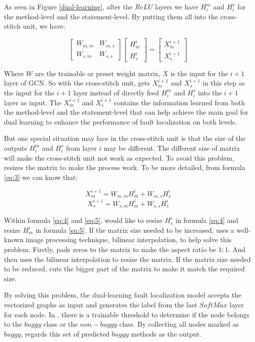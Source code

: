 As seen in Figure \ref{dual-learning}, after the $ReLU$ layers we have $H_i^m$ and $H_i^s$ for the method-level and the statement-level. By putting them all into the cross-stitch unit, we have:

\begin{equation}\label{eq:3}
	\begin{bmatrix}
		W_{m,m} &  W_{m,s} \\
		W_{s,m} &  W_{s,s}
	\end{bmatrix}
	\begin{bmatrix}
		H_m^{i}\\
		H_s^{i}
	\end{bmatrix}=
	\begin{bmatrix}
		X_m^{i+1}\\
		X_s^{i+1}
	\end{bmatrix}
\end{equation}

Where $W$ are the trainable or preset weight matrix, $X$ is the input for the $i+1$ layer of GCN. So with the cross-stitch unit, \tool gets $X_m^{i+1}$ and $X_s^{i+1}$ in this step as the input for the $i+1$ layer instead of directly feed $H_i^m$ and $H_i^s$ into the $i+1$ layer as input. The $X_m^{i+1}$ and $X_s^{i+1}$ contains the information learned from both the method-level and the statement-level that can help achieve the main goal for dual learning to enhance the performance of fault localization on both levels.

But one special situation \tool may face in the cross-stitch unit is that the size of the outputs $H_i^m$ and $H_i^s$ from layer $i$ may be different. The different size of matrix will make the cross-stitch unit not work as expected. To avoid this problem, \tool resizes the matrix to make the process work. To be more detailed, from formula \ref{eq:3} we can know that:

\begin{equation}\label{eq:4}
	X_m^{i+1} = W_{m,m}H_m^{i} + W_{m,s}H_s^{i}
\end{equation}
\begin{equation}\label{eq:5}
	X_s^{i+1} = W_{s,m}H_m^{i} + W_{s,s}H_s^{i}
\end{equation}

Within formula \ref{eq:4} and \ref{eq:5}, \tool would like to resize $H_s^{i}$ in formula \ref{eq:4} and resize $H_m^{i}$ in formula \ref{eq:5}. If the matrix size needed to be increased, \tool uses a well-known image processing technique, bilinear interpolation, to help solve this problem. Firstly, \tool pads zeros to the matrix to make the aspect ratio be $1:1$. And then \tool uses the bilinear interpolation to resize the matrix. If the matrix size needed to be reduced, \tool cuts the bigger part of the matrix to make it match the required size.

By solving this problem, the dual-learning fault localization model accepts the vectorized graphs as input and generates the label from the last $SoftMax$ layer for each node. In \tool, there is a trainable threshold to determine if the node belongs to the $buggy$ class or the $non-buggy$ class. By collecting all nodes marked as $buggy$, \tool regards this set of predicted $buggy$ methods as the output. 

